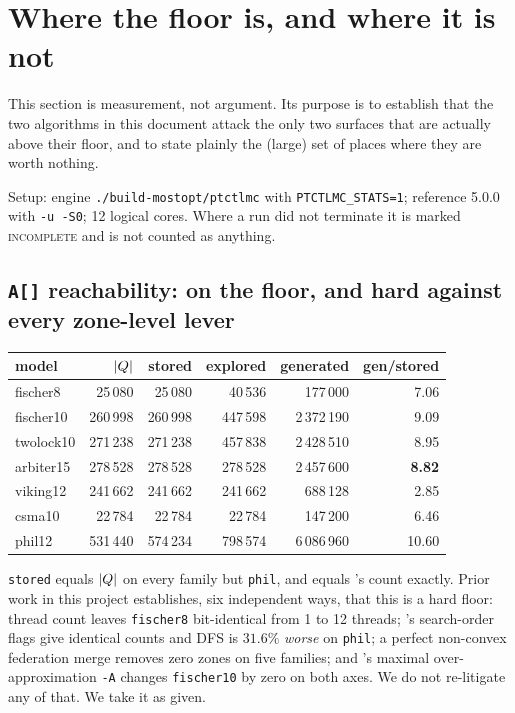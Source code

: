 \section{Where the floor is, and where it is not}
\label{sec:floor}

This section is measurement, not argument. Its purpose is to establish that the two algorithms in
this document attack the only two surfaces that are actually above their floor, and to state
plainly the (large) set of places where they are worth nothing.

Setup: engine \texttt{./build-mostopt/ptctlmc} with \texttt{PTCTLMC\_STATS=1}; reference
\verifyta{} 5.0.0 with \texttt{-u -S0}; 12 logical cores. Where a run did not terminate it is
marked \textsc{incomplete} and is not counted as anything.

\subsection{\texttt{A[]} reachability: on the floor, and hard against every zone-level lever}

\begin{center}\small
\begin{tabular}{lrrrrr}
\toprule
model & $|Q|$ & stored & explored & generated & gen/stored \\
\midrule
fischer8   & 25\,080  & 25\,080  & 40\,536  & 177\,000     & 7.06 \\
fischer10  & 260\,998 & 260\,998 & 447\,598 & 2\,372\,190  & 9.09 \\
twolock10  & 271\,238 & 271\,238 & 457\,838 & 2\,428\,510  & 8.95 \\
arbiter15  & 278\,528 & 278\,528 & 278\,528 & 2\,457\,600  & \textbf{8.82} \\
viking12   & 241\,662 & 241\,662 & 241\,662 & 688\,128     & 2.85 \\
csma10     & 22\,784  & 22\,784  & 22\,784  & 147\,200     & 6.46 \\
phil12     & 531\,440 & 574\,234 & 798\,574 & 6\,086\,960  & 10.60 \\
\bottomrule
\end{tabular}
\end{center}
\measured{}

\noindent
\texttt{stored} equals $|Q|$ on every family but \texttt{phil}, and equals \verifyta{}'s count
exactly. Prior work in this project establishes, six independent ways, that this is a hard floor:
thread count leaves \texttt{fischer8} bit-identical from 1 to 12 threads; \verifyta{}'s search-order
flags give identical counts and DFS is $31.6\%$ \emph{worse} on \texttt{phil}; a perfect non-convex
federation merge removes zero zones on five families; and \verifyta{}'s maximal over-approximation
\texttt{-A} changes \texttt{fischer10} by zero on both axes. We do not re-litigate any of that. We
take it as given.

